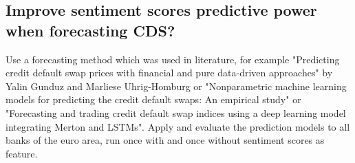 %
%
%

\subsection{Improve sentiment scores predictive power when forecasting CDS?}

Use a forecasting method which was used in literature, for example "Predicting credit default swap prices with financial and pure data-driven approaches" by Yalin Gunduz and Marliese Uhrig-Homburg or "Nonparametric machine learning models for predicting the credit default swaps: An empirical study" or "Forecasting and trading credit default swap indices using a deep learning model integrating Merton and LSTMs". Apply and evaluate the prediction models to all banks of the euro area, run once with and once without sentiment scores as feature.


